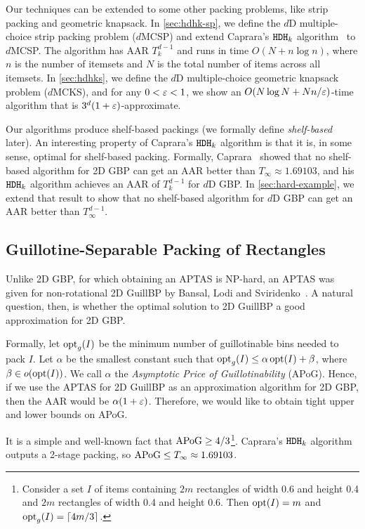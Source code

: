 Our techniques can be extended to some other packing problems,
like strip packing and geometric knapsack.
In \cref{sec:hdhk-sp}, we define the $d$D multiple-choice strip packing problem ($d$MCSP)
and extend Caprara's $\operatorname{\mathtt{HDH}}_{k}$ algorithm~\cite{caprara2008} to $d$MCSP.
The algorithm has AAR $T_k^{d-1}$ and runs in time $O(N + n\log n)$,
where $n$ is the number of itemsets and $N$ is the total number of items across all itemsets.
In \cref{sec:hdhks}, we define the $d$D multiple-choice geometric knapsack problem ($d$MCKS),
and for any $0 < \varepsilon < 1$, we show an $O(N\log N + Nn/\varepsilon)$-time algorithm
that is $3^d(1+\varepsilon)$-approximate.

Our algorithms produce shelf-based packings (we formally define \emph{shelf-based} later).
An interesting property of Caprara's $\operatorname{\mathtt{HDH}}_{k}$ algorithm is that it is,
in some sense, optimal for shelf-based packing. Formally,
Caprara~\cite{caprara2008} showed that no shelf-based algorithm for 2D GBP can get an AAR
better than $T_{\infty} \approx 1.69103$,
and his $\operatorname{\mathtt{HDH}}_{k}$ algorithm achieves an AAR of $T_k^{d-1}$ for $d$D GBP.
In \cref{sec:hard-example}, we extend that result to show that no shelf-based algorithm
for $d$D GBP can get an AAR better than $T_{\infty}^{d-1}$.

\subsection{Guillotine-Separable Packing of \Thin{} Rectangles}
\label{sec:intro:guill-thin}

Unlike 2D GBP, for which obtaining an APTAS is NP-hard,
an APTAS was given for non-rotational 2D GuillBP
by Bansal, Lodi and Sviridenko~\cite{bansal2005tale}.
A natural question, then, is whether the optimal solution to 2D GuillBP
a good approximation for 2D GBP.

Formally, let $\operatorname{opt}_g(I)$ be the minimum number of guillotinable bins needed to pack $I$.
Let $\alpha$ be the smallest constant such that
$\operatorname{opt}_g(I) \le \alpha\operatorname{opt}(I) + \beta$, where $\beta \in o(\operatorname{opt}(I))$.
We call $\alpha$ the \emph{Asymptotic Price of Guillotinability} (APoG).
Hence, if we use the APTAS for 2D GuillBP as an approximation algorithm for 2D GBP,
then the AAR would be $\alpha(1 + \varepsilon)$.
Therefore, we would like to obtain tight upper and lower bounds on APoG.

It is a simple and well-known fact that $\mathrm{APoG} \ge 4/3$\footnote{Consider
a set $I$ of items containing $2m$ rectangles of width 0.6 and height 0.4 and
$2m$ rectangles of width 0.4 and height 0.6.
Then $\operatorname{opt}(I) = m$ and $\operatorname{opt}_g(I) = \left\lceil 4m/3 \right\rceil$.}.
Caprara's $\operatorname{\mathtt{HDH}}_{k}$ algorithm~\cite{caprara2008} outputs a 2-stage packing,
so $\mathrm{APoG} \le T_{\infty} \approx 1.69103$.

